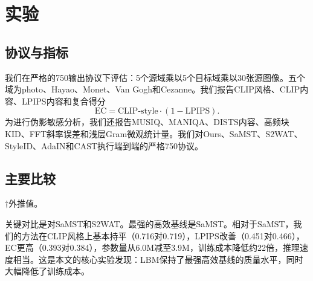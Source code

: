 ﻿\documentclass[letterpaper]{article}
\begin{document}
\section{实验}
\subsection{协议与指标}
我们在严格的750输出协议下评估：5个源域乘以5个目标域乘以30张源图像。五个域为photo、Hayao、Monet、Van Gogh和Cezanne。我们报告CLIP风格、CLIP内容、LPIPS内容和复合得分
\begin{equation}
    \mathrm{EC} = \mathrm{CLIP\text{-}style}\cdot(1-\mathrm{LPIPS}).
\end{equation}
为进行伪影敏感分析，我们还报告MUSIQ、MANIQA、DISTS内容、高频块KID、FFT斜率误差和浅层Gram微观统计量。我们对Ours、SaMST、S2WAT、StyleID、AdaIN和CAST执行端到端的严格750协议。

\subsection{主要比较}
\begin{table}[t]
\centering
\caption{严格750核心对比与效率指标。$\uparrow$ = 越高越好，$\downarrow$ = 越低越好。推理时间为750张图像的端到端测量。$\dagger$标记的训练时间由外推获得。}
\label{tab:main}
\small
\setlength{\tabcolsep}{5pt}
\smallskip
\footnoterule\small
$\dagger$外推值。
\end{table}

关键对比是对SaMST和S2WAT。最强的高效基线是SaMST。相对于SaMST，我们的方法在CLIP风格上基本持平（0.716对0.719），LPIPS改善（0.451对0.466），EC更高（0.393对0.384），参数量从6.0M减至3.9M，训练成本降低约22倍，推理速度相当。这是本文的核心实验发现：LBM保持了最强高效基线的质量水平，同时大幅降低了训练成本。
\end{document}
